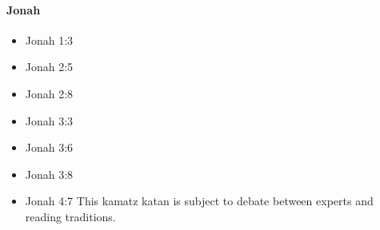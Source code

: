 \documentclass[14pt]{article}
\begin{document}
															\paragraph{Jonah}
														\begin{multicols}{2}\begin{itemize}
																
																\item Jonah 1:3
																
																\item Jonah 2:5
																
																\item Jonah 2:8
																
																\item Jonah 3:3
																
																\item Jonah 3:6
																
																\item Jonah 3:8
																
																\item Jonah 4:7 This kamatz katan is subject to debate between experts and reading traditions.
																
																								\end{itemize}\end{multicols}
\end{document}
